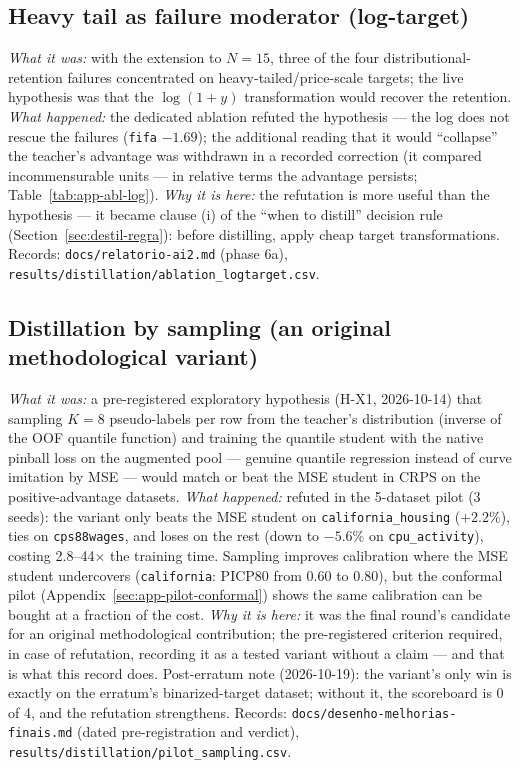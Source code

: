 \subsection{Heavy tail as failure moderator (log-target)}
\emph{What it was:} with the extension to $N{=}15$, three of the
four distributional-retention failures concentrated on
heavy-tailed/price-scale targets; the live hypothesis was that the
$\log(1+y)$ transformation would recover the retention. \emph{What
happened:} the dedicated ablation refuted the hypothesis --- the log
does not rescue the failures (\texttt{fifa} $-1.69$); the additional
reading that it would ``collapse'' the teacher's advantage was
withdrawn in a recorded correction (it compared incommensurable
units --- in relative terms the advantage persists;
Table~\ref{tab:app-abl-log}). \emph{Why it is here:} the refutation
is more useful than the hypothesis --- it became clause (i) of the
``when to distill'' decision rule (Section~\ref{sec:destil-regra}):
before distilling, apply cheap target transformations. Records:
\texttt{docs/\allowbreak relatorio-\allowbreak ai2.\allowbreak md}
(phase 6a),
\texttt{results/\allowbreak distillation/\allowbreak ablation\_\allowbreak logtarget.\allowbreak csv}.

\subsection{Distillation by sampling (an original methodological variant)}
\emph{What it was:} a pre-registered exploratory hypothesis (H-X1,
2026-10-14) that sampling $K{=}8$ pseudo-labels per row from the
teacher's distribution (inverse of the OOF quantile function) and
training the quantile student with the native pinball loss on the
augmented pool --- genuine quantile regression instead of curve
imitation by MSE --- would match or beat the MSE student in CRPS on
the positive-advantage datasets. \emph{What happened:} refuted in
the 5-dataset pilot (3 seeds): the variant only beats the MSE
student on \texttt{california\_\allowbreak housing} ($+2.2\%$), ties
on \texttt{cps88wages}, and loses on the rest (down to $-5.6\%$ on
\texttt{cpu\_activity}), costing 2.8--44$\times$ the training time.
Sampling improves calibration where the MSE student undercovers
(\texttt{california}: PICP80 from 0.60 to 0.80), but the conformal
pilot (Appendix~\ref{sec:app-pilot-conformal}) shows the same
calibration can be bought at a fraction of the cost. \emph{Why it is
here:} it was the final round's candidate for an original
methodological contribution; the pre-registered criterion required,
in case of refutation, recording it as a tested variant without a
claim --- and that is what this record does. Post-erratum note
(2026-10-19): the variant's only win is exactly on the erratum's
binarized-target dataset; without it, the scoreboard is 0 of 4, and
the refutation strengthens. Records:
\texttt{docs/\allowbreak desenho-\allowbreak melhorias-\allowbreak finais.\allowbreak md}
(dated pre-registration and verdict),
\texttt{results/\allowbreak distillation/\allowbreak pilot\_\allowbreak sampling.\allowbreak csv}.

